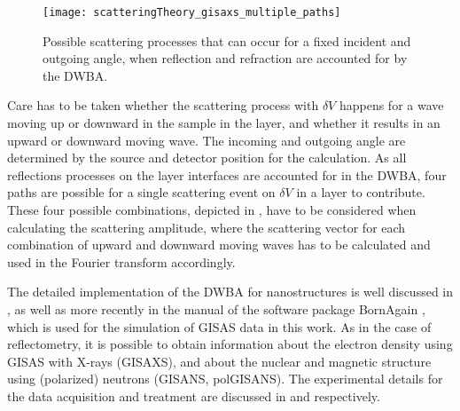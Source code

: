 \documentclass[\main/dresen_thesis.tex]{subfiles}
\begin{document}
    \begin{figure}
      \centering
      \texttt{[image: scatteringTheory\_gisaxs\_multiple\_paths]}
      \caption{\label{fig:theoreticalBackground:scattering:gisas:multiplePaths}Possible scattering processes that can occur for a fixed incident and outgoing angle, when reflection and refraction are accounted for by the DWBA.}
    \end{figure}
    Care has to be taken whether the scattering process with $\delta V$ happens for a wave moving up or downward in the sample in the layer, and whether it results in an upward or downward moving wave.
    The incoming and outgoing angle are determined by the source and detector position for the calculation.
    As all reflections processes on the layer interfaces are accounted for in the DWBA, four paths are possible for a single scattering event on $\delta V$ in a layer to contribute.
    These four possible combinations, depicted in , have to be considered when calculating the scattering amplitude, where the scattering vector for each combination of upward and downward moving waves has to be calculated and used in the Fourier transform accordingly.

    The detailed implementation of the DWBA for nanostructures is well discussed in \cite{Lazzari_2002_Isgis}, as well as more recently in the manual of the software package BornAgain \cite{Burle_2018_borna}, which is used for the simulation of GISAS data in this work.
    As in the case of reflectometry, it is possible to obtain information about the electron density using GISAS with X-rays (GISAXS), and about the nuclear and magnetic structure using (polarized) neutrons (GISANS, polGISANS).
    The experimental details for the data acquisition and treatment are discussed in  and  respectively.
\end{document}
